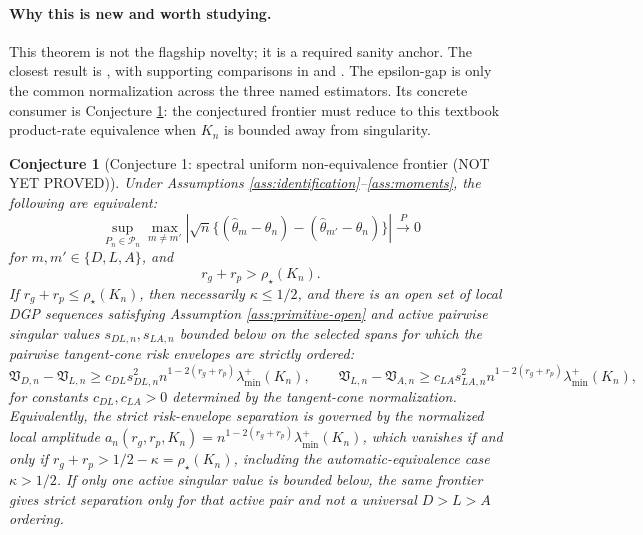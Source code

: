 \documentclass[11pt]{article}
\theoremstyle{definition}
\theoremstyle{plain}
\newtheorem{conjecture}{Conjecture}
\theoremstyle{remark}
\begin{document}
\paragraph{Why this is new and worth studying.}
This theorem is not the flagship novelty; it is a required sanity anchor.  The
closest result is \citet{ChernozhukovEtAl2018DML}, with supporting comparisons
in \citet{ChernozhukovEscancianoIchimuraNeweyRobins2022LRO} and
\citet{ChernozhukovNeweySingh2022ADML}.  The epsilon-gap is only the common
normalization across the three named estimators.  Its concrete consumer is
Conjecture \ref{conj:spectral-frontier}: the conjectured frontier must reduce
to this textbook product-rate equivalence when \(K_n\) is bounded away from
singularity.

\begin{conjecture}[Conjecture 1: spectral uniform non-equivalence frontier (NOT YET PROVED)]\label{conj:spectral-frontier}
Under Assumptions \ref{ass:identification}--\ref{ass:moments}, the following
are equivalent:
\[
\sup_{P_n\in\mathcal{P}_n}\max_{m\ne m'}\left|
\sqrt n\{(\hat\theta_m-\theta_n)-(\hat\theta_{m'}-\theta_n)\}\right|
\stackrel{P}{\longrightarrow}0
\]
for \(m,m'\in\{D,L,A\}\), and
\[
r_g+r_p>\rho_\star(K_n).
\]
If \(r_g+r_p\le \rho_\star(K_n)\), then necessarily \(\kappa\le 1/2\), and
there is an open set of local DGP sequences satisfying Assumption
\ref{ass:primitive-open} and active pairwise singular values
\(s_{DL,n},s_{LA,n}\) bounded below on the selected spans for which the pairwise
tangent-cone risk envelopes are strictly ordered:
\[
\mathfrak V_{D,n}-\mathfrak V_{L,n}
\ge c_{DL} s_{DL,n}^2 n^{1-2(r_g+r_p)}\lambda_{\min}^+(K_n),\qquad
\mathfrak V_{L,n}-\mathfrak V_{A,n}
\ge c_{LA} s_{LA,n}^2 n^{1-2(r_g+r_p)}\lambda_{\min}^+(K_n),
\]
for constants \(c_{DL},c_{LA}>0\) determined by the tangent-cone normalization.
Equivalently, the strict risk-envelope separation is governed by the normalized
local amplitude
\(a_n(r_g,r_p,K_n)=n^{1-2(r_g+r_p)}\lambda_{\min}^+(K_n)\), which vanishes
if and only if \(r_g+r_p>1/2-\kappa=\rho_\star(K_n)\), including the
automatic-equivalence case \(\kappa>1/2\).  If only one active singular value is
bounded below, the same frontier gives strict separation only for that active
pair and not a universal \(D>L>A\) ordering.
\end{conjecture}
\end{document}

